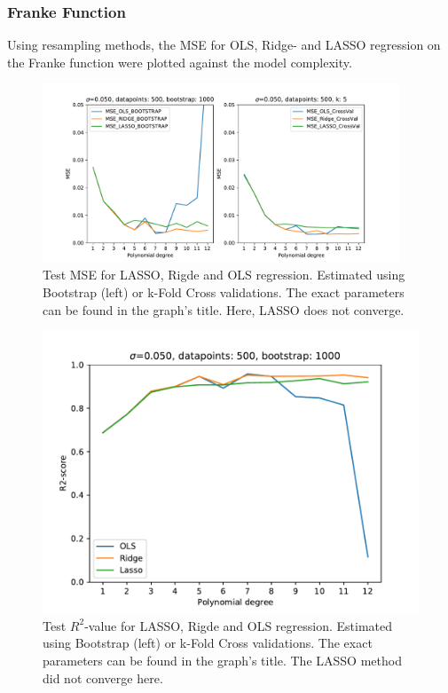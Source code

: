 \documentclass[11pt,a4paper,titlepage]{article}
\begin{document}
\subsubsection{Franke Function}
Using resampling methods, the MSE for OLS, Ridge- and LASSO regression on the Franke function were plotted against the model complexity.
\begin{figure}[H]
\centering
\includegraphics[width=0.95\textwidth]{MSE_different_methods_Franke.pdf}
\caption[Test MSE for LASSO, Rigde and OLS regression (Franke)]{Test MSE for LASSO, Rigde and OLS regression. Estimated using Bootstrap (left) or k-Fold Cross validations. The exact parameters can be found in the graph's title. Here, LASSO does not converge.}
\label{fig:MSE_different_methods_Franke}
\end{figure}
\begin{figure}[H]
\centering
\includegraphics[trim=0.7cm 0.2cm 1cm 0.85cm, clip=true,scale = 0.7]{R2_bootstrap_different_methods_Franke.pdf}
\caption[Test $R^2$-value for LASSO, Rigde and OLS regression]{Test $R^2$-value for LASSO, Rigde and OLS regression. Estimated using Bootstrap (left) or k-Fold Cross validations. The exact parameters can be found in the graph's title. The LASSO method did not converge here.}
\label{fig:R2_different_methods_Franke}
\end{figure}
\end{document}
